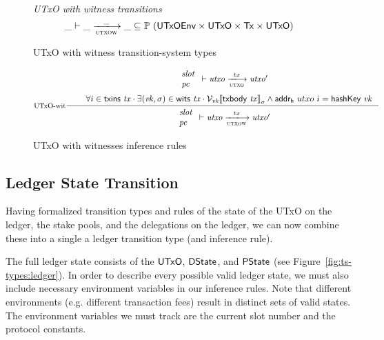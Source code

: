 \documentclass[11pt,a4paper]{article}
\newcommand{\Tx}{\type{Tx}}
\newcommand{\UTxO}{\type{UTxO}}
\newcommand{\DState}{\type{DState}}
\newcommand{\PState}{\type{PState}}
\newcommand{\UTxOEnv}{\type{UTxOEnv}}
\newcommand{\txins}[1]{\fun{txins}~ \var{#1}}
\newcommand{\wits}[1]{\fun{wits}~ \var{#1}}
\newcommand{\serialised}[1]{\llbracket \var{#1} \rrbracket}
\newcommand{\hashKey}[1]{\fun{hashKey}~ \var{#1}}
\newcommand{\txbody}[1]{\fun{txbody}~ \var{#1}}
\theoremstyle{definition}
\theoremstyle{definition}
\begin{document}
\begin{figure}
  \emph{UTxO with witness transitions}
  \begin{equation*}
    \var{\_} \vdash
    \var{\_} \trans{utxow}{\_} \var{\_}
    \subseteq \powerset (\UTxOEnv \times \UTxO \times \Tx \times \UTxO)
  \end{equation*}
  \caption{UTxO with witness transition-system types}
  \label{fig:ts-types:utxow}
\end{figure}


\begin{figure}
  \begin{equation}
    \label{eq:utxo-witness-inductive}
    \inference[UTxO-wit]
    {
      {
        \begin{array}{l}
        \var{slot}\\
        \var{pc}
        \end{array}
      }
      \vdash \var{utxo} \trans{utxo}{tx} \var{utxo'}\\ ~ \\
      & \forall i \in \txins{tx} \cdot \exists (\var{vk}, \sigma) \in \wits{\var{tx}}
      \cdot
      \mathcal{V}_{\var{vk}}{\serialised{\txbody{tx}}}_{\sigma}
      \wedge  \fun{addr_h}~{utxo}~i = \hashKey{vk}\\
    }
    {
      \begin{array}{l}
        \var{slot}\\
        \var{pc}\\
      \end{array}
      \vdash \var{utxo} \trans{utxow}{tx} \var{utxo'}
    }
  \end{equation}
  \caption{UTxO with witnesses inference rules}
  \label{fig:rules:utxow}
\end{figure}

\subsection{Ledger State Transition}
\label{sec:ledger}

Having formalized transition types and rules of the state of the UTxO
on the ledger, the stake pools, and the delegations on the ledger, we can
now combine these into a single a ledger transition type (and inference rule).

The full ledger state consists of the $\UTxO$, $\DState$, and $\PState$ (see Figure~\ref{fig:ts-types:ledger}). In order to describe every possible valid
ledger state, we must also include necessary environment variables in our
inference rules. Note that different environments (e.g. different transaction
fees) result in distinct sets of valid states. The environment variables
we must track are the current slot number and the protocol constants.
\end{document}
